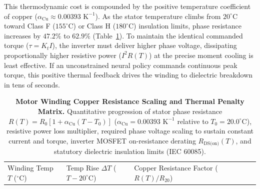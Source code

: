 \documentclass[
  letterpaper,
  DIV=11,
  numbers=noendperiod]{scrartcl}
\begin{document}
This thermodynamic cost is compounded by the positive temperature
coefficient of copper
(\(\alpha_{\text{Cu}} \approx 0.00393\text{ K}^{-1}\)). As the stator
temperature climbs from \(20^\circ\text{C}\) toward Class F
(\(155^\circ\text{C}\)) or Class H (\(180^\circ\text{C}\)) insulation
limits, phase resistance increases by \(47.2\%\) to \(62.9\%\)
(Table~\ref{tbl-02-thermal-scaling}). To maintain the identical
commanded torque (\(\tau = K_t I\)), the inverter must deliver higher
phase voltage, dissipating proportionally higher resistive power
(\(I^2 R(T)\)) at the precise moment cooling is least effective. If an
unconstrained neural policy commands continuous peak torque, this
positive thermal feedback drives the winding to dielectric breakdown in
tens of seconds.

\begin{longtable}[]{@{}
  >{\raggedright\arraybackslash}p{}
  >{\raggedright\arraybackslash}p{}
  >{\raggedright\arraybackslash}p{}
  >{\raggedright\arraybackslash}p{}
  >{\raggedright\arraybackslash}p{}
  >{\raggedright\arraybackslash}p{}
  >{\raggedright\arraybackslash}p{}@{}}
\caption{\textbf{Motor Winding Copper Resistance Scaling and Thermal
Penalty Matrix.} Quantitative progression of stator phase resistance
\(R(T) = R_0 [1 + \alpha_{\text{Cu}}(T - T_0)]\)
(\(\alpha_{\text{Cu}} = 0.00393\text{ K}^{-1}\) relative to
\(T_0 = 20.0^\circ\text{C}\)), resistive power loss multiplier, required
phase voltage scaling to sustain constant current and torque, inverter
MOSFET on-resistance derating \(R_{\text{DS(on)}}(T)\), and statutory
dielectric insulation limits (IEC
60085).}\label{tbl-02-thermal-scaling}\tabularnewline
\toprule\noalign{}
\begin{minipage}[b]{\linewidth}\raggedright
Winding Temp \(T\) (\(^\circ\text{C}\))
\end{minipage} & \begin{minipage}[b]{\linewidth}\raggedright
Temp Rise \(\Delta T\) (\(T - 20^\circ\text{C}\))
\end{minipage} & \begin{minipage}[b]{\linewidth}\raggedright
Copper Resistance Factor (\(R(T) / R_{20}\))
\end{minipage} & \begin{minipage}[b]{\linewidth}\raggedright

\end{minipage}
\end{longtable}
\end{document}
